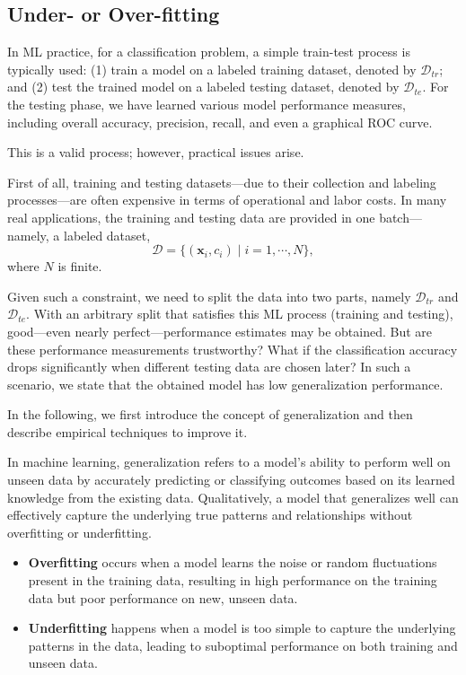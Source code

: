 \documentclass[12pt]{article}
\begin{document}
\subsection{Under- or Over-fitting}
In ML practice, for a classification problem, a simple train-test process is typically used: (1) train a model on a labeled training dataset, denoted by \(\mathcal{D}_{tr}\); and (2) test the trained model on a labeled testing dataset, denoted by \(\mathcal{D}_{te}\). For the testing phase, we have learned various model performance measures, including overall accuracy, precision, recall, and even a graphical ROC curve.

This is a valid process; however, practical issues arise.

First of all, training and testing datasets—due to their collection and labeling processes—are often expensive in terms of operational and labor costs. In many real applications, the training and testing data are provided in one batch—namely, a labeled dataset,
\[
\mathcal{D} = \{(\mathbf{x}_i, c_i) \mid i = 1, \cdots, N\},
\]
where \(N\) is finite.

Given such a constraint, we need to split the data into two parts, namely \(\mathcal{D}_{tr}\) and \(\mathcal{D}_{te}\). With an arbitrary split that satisfies this ML process (training and testing), good—even nearly perfect—performance estimates may be obtained. But are these performance measurements trustworthy? What if the classification accuracy drops significantly when different testing data are chosen later? In such a scenario, we state that the obtained model has low generalization performance.

In the following, we first introduce the concept of generalization and then describe empirical techniques to improve it.

In machine learning, generalization refers to a model's ability to perform well on unseen data by accurately predicting or classifying outcomes based on its learned knowledge from the existing data. Qualitatively, a model that generalizes well can effectively capture the underlying true patterns and relationships without overfitting or underfitting.
\begin{itemize}
    \item \textbf{Overfitting} occurs when a model learns the noise or random fluctuations present in the training data, resulting in high performance on the training data but poor performance on new, unseen data.
    \item \textbf{Underfitting} happens when a model is too simple to capture the underlying patterns in the data, leading to suboptimal performance on both training and unseen data.
\end{itemize}
\end{document}
